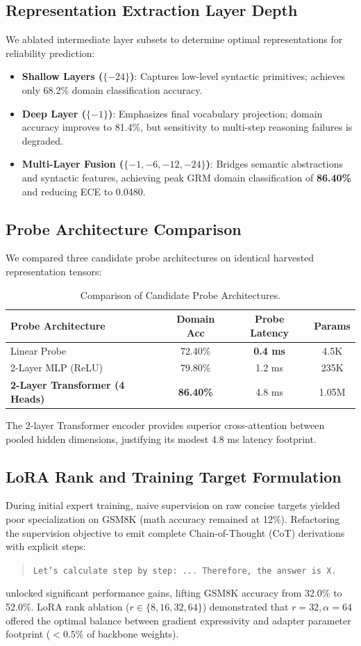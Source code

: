 \documentclass[journal,10pt,twocolumn]{IEEEtran}
\begin{document}
\subsection{Representation Extraction Layer Depth}
We ablated intermediate layer subsets to determine optimal representations for reliability prediction:
\begin{itemize}
    \item \textbf{Shallow Layers ($\{-24\}$)}: Captures low-level syntactic primitives; achieves only 68.2\% domain classification accuracy.
    \item \textbf{Deep Layer ($\{-1\}$)}: Emphasizes final vocabulary projection; domain accuracy improves to 81.4\%, but sensitivity to multi-step reasoning failures is degraded.
    \item \textbf{Multi-Layer Fusion ($\{-1, -6, -12, -24\}$)}: Bridges semantic abstractions and syntactic features, achieving peak GRM domain classification of \textbf{86.40\%} and reducing ECE to 0.0480.
\end{itemize}

\subsection{Probe Architecture Comparison}
We compared three candidate probe architectures on identical harvested representation tensors:
\begin{table}[h]
\centering
\caption{Comparison of Candidate Probe Architectures.}
\label{tab:probe_architectures}
\begin{tabular}{lccc}
\toprule
\textbf{Probe Architecture} & \textbf{Domain Acc} & \textbf{Probe Latency} & \textbf{Params} \\
\midrule
Linear Probe & 72.40\% & \textbf{0.4 ms} & 4.5K \\
2-Layer MLP (ReLU) & 79.80\% & 1.2 ms & 235K \\
\textbf{2-Layer Transformer (4 Heads)} & \textbf{86.40\%} & 4.8 ms & 1.05M \\
\bottomrule
\end{tabular}
\end{table}
The 2-layer Transformer encoder provides superior cross-attention between pooled hidden dimensions, justifying its modest 4.8 ms latency footprint.

\subsection{LoRA Rank and Training Target Formulation}
During initial expert training, naive supervision on raw concise targets yielded poor specialization on GSM8K (math accuracy remained at 12\%). Refactoring the supervision objective to emit complete Chain-of-Thought (CoT) derivations with explicit steps:
\begin{quote}
\small \texttt{Let's calculate step by step: ... Therefore, the answer is X.}
\end{quote}
unlocked significant performance gains, lifting GSM8K accuracy from 32.0\% to 52.0\%. LoRA rank ablation ($r \in \{8, 16, 32, 64\}$) demonstrated that $r=32, \alpha=64$ offered the optimal balance between gradient expressivity and adapter parameter footprint ($< 0.5\%$ of backbone weights).
\end{document}
